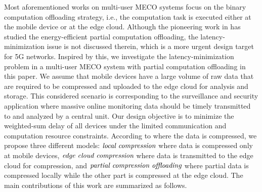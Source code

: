 \documentclass[journal,draftcls,onecolumn,12pt,twoside]{IEEEtran}
\begin{document}
Most aforementioned works on multi-user MECO systems focus on the binary computation offloading strategy, i.e., the computation task is executed either at the mobile device or at the edge cloud. Although the pioneering work in \cite{Multi_user_1} has studied the energy-efficient partial computation offloading, the latency-minimization issue is not discussed therein, which is a more urgent design target for 5G networks. Inspired by this, we investigate the latency-minimization problem in a multi-user MECO system with partial computation offloading in this paper. We assume that mobile devices have a large volume of raw data that are required to be compressed and uploaded to the edge cloud for analysis and storage. This considered scenario is corresponding to the surveillance and security application where massive online monitoring data should be timely transmitted to and analyzed by a central unit. Our design objective is to minimize the weighted-sum delay of all devices under the limited communication and computation resource constraints. According to where the data is compressed, we propose three different models: $\emph{local compression}$ where data is compressed only at mobile devices, $\emph{edge cloud compression}$ where data is transmitted to the edge cloud for compression, and $\emph{partial compression offloading}$ where partial data is compressed locally while the other part is compressed at the edge cloud. The main contributions of this work are summarized as follows.
\end{document}
